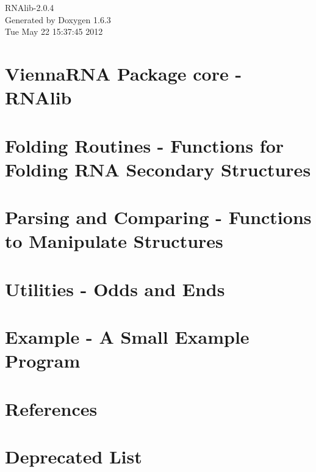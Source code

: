 \documentclass[a4paper]{book}
\begin{document}
\hypersetup{pageanchor=false}
\begin{titlepage}
\vspace*{7cm}
\begin{center}
{\Large RNAlib-\/2.0.4 }\\
\vspace*{1cm}
{\large Generated by Doxygen 1.6.3}\\
\vspace*{0.5cm}
{\small Tue May 22 15:37:45 2012}\\
\end{center}
\end{titlepage}
\clearemptydoublepage
{}
\tableofcontents
\clearemptydoublepage
{}
\hypersetup{pageanchor=true}
\chapter{ViennaRNA Package core -\/ RNAlib}
\label{index}\hypertarget{index}{}
\chapter{Folding Routines -\/ Functions for Folding RNA Secondary Structures}
\label{mp_fold}
\hypertarget{mp_fold}{}

\chapter{Parsing and Comparing -\/ Functions to Manipulate Structures}
\label{mp_parse}
\hypertarget{mp_parse}{}

\chapter{Utilities -\/ Odds and Ends}
\label{mp_utils}
\hypertarget{mp_utils}{}

\chapter{Example -\/ A Small Example Program}
\label{mp_example}
\hypertarget{mp_example}{}

\chapter{References}
\label{mp_ref}
\hypertarget{mp_ref}{}

\chapter{Deprecated List}
\label{deprecated}
\hypertarget{deprecated}{}

\end{document}
